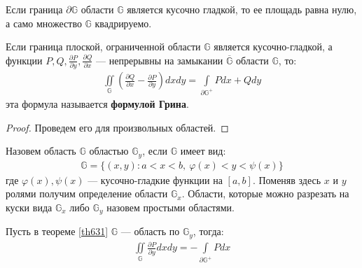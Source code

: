 \begin{remark}
  Если граница $\partial \mathbb{G}$ области $\mathbb{G}$ является кусочно
  гладкой, то ее площадь равна нулю, а само множество $\mathbb{G}$ квадрируемо.
\end{remark}

\begin{theorem}
  \label{th631}
  Если граница плоской, ограниченной области $\mathbb{G}$ является
  кусочно-гладкой, а функции $P, Q, \frac{\partial P}{\partial y},
  \frac{\partial Q}{\partial x}$ --- непрерывны на замыкании
  $\overline{\mathbb{G}}$ области $\mathbb{G}$, то:
  \begin{gather}
    \iint\limits_{\mathbb{G}} \left(\frac{\partial Q}{\partial x} -
    \frac{\partial P}{\partial y} \right) dx dy = \int\limits_{\partial
      \mathbb{G}^+} Pdx + Qdy
    \label{th631:eq1}
  \end{gather}
  эта формула называется {\bfseries формулой Грина}.
\end{theorem}

\begin{proof}
  Проведем его для произвольных областей.
\end{proof}

\begin{definition}
  Назовем область $\mathbb{G}$ областью $\mathbb{G}_y$, если $\mathbb{G}$ имеет
  вид:
  \begin{gather}
    \mathbb{G} = \{(x, y) : a < x < b, \ \varphi(x) < y < \psi(x)\}
    \label{def634:eq1}
  \end{gather}
  где $\varphi(x), \psi(x)$ --- кусочно-гладкие функции на $[a,b]$. Поменяв
  здесь $x$ и $y$ ролями получим определение области $\mathbb{G}_x$. Области,
  которые можно разрезать на куски вида $\mathbb{G}_x$ либо $\mathbb{G}_y$
  назовем простыми областями.
\end{definition}

\begin{lemma}
  Пусть в теореме \eqref{th631} $\mathbb{G}$ --- область по $\mathbb{G}_y$,
  тогда:
  \begin{gather}
    \iint\limits_{\mathbb{G}} \frac{\partial P}{\partial y} dx dy = -
    \int\limits_{\partial \mathbb{G}^+} Pdx
    \label{lem631:eq1}
  \end{gather}
\end{lemma}

